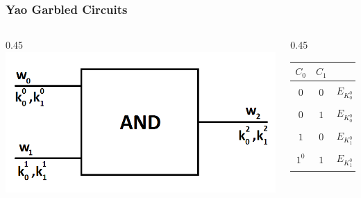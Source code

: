 \documentclass{beamer}
\begin{document}
	\begin{frame}
		\frametitle{Yao Garbled Circuits}

		\begin{columns}
			\begin{column}{0.45\textwidth}
				\includegraphics[scale=0.3]{Images/BasicGarbling}
			\end{column}

			\begin{column}{0.45\textwidth}
				\begin{tabular}[!htb]{c | c || c}
					$C_0$ & $C_1$ & \\
					\hline
					\hline
					$0$ & $0$ & $E_{K_0^0}(E_{K_0^1}(K_0^2))$\\
					\hline
					$0$ & $1$ & $E_{K_0^0}(E_{K_1^1}(K_0^2))$\\
					\hline
					$1$ & $0$ & $E_{K_1^0}(E_{K_0^1}(K_0^2))$\\
					\hline
					$1^0$ & $1$ & $E_{K_1^0}(E_{K_1^1}(K_1^2))$\\
				\end{tabular}
			\end{column}
		\end{columns}

	\end{frame}
\end{document}
